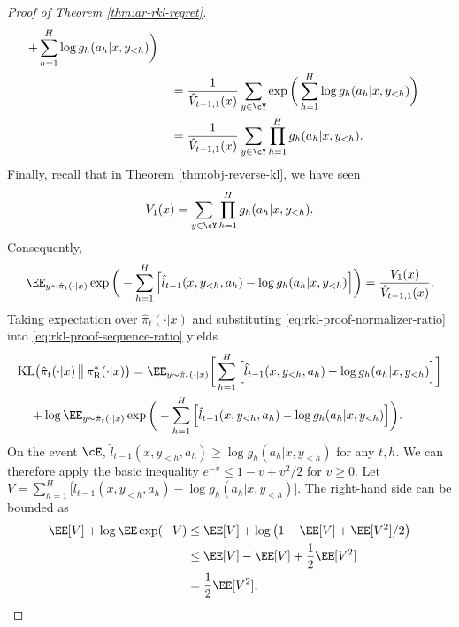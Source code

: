 \documentclass[11pt]{article}
\newcommand{\KL}{\text{KL}}
\newcommand{\pir}{\pi_{\mathrm{R}}}
\begin{document}
\begin{proof}[Proof of Theorem \ref{thm:ar-rkl-regret}]
\begin{align*}
        +
        \sum_{h=1}^H\log g_h(a_h|x,y_{<h})
    \bigg)\\
    &\quad=
    \frac{1}{\hat V_{t-1,1}(x)}
    \sum_{y\in\cY}
    \exp\bigg(
        \sum_{h=1}^H\log g_h(a_h|x,y_{<h})
    \bigg)\\
    &\quad=
    \frac{1}{\hat V_{t-1,1}(x)}
    \sum_{y\in\cY}
    \prod_{h=1}^H g_h(a_h|x,y_{<h}).
\end{align*}
Finally, recall that in Theorem \ref{thm:obj-reverse-kl}, we have seen
\begin{align*}
    V_1(x)
    =
    \sum_{y\in\cY}
    \prod_{h=1}^H g_h(a_h|x,y_{<h}).
\end{align*}
Consequently,
\begin{align}
    \EE_{y\sim\hat\pi_t(\cdot|x)}
    \exp\bigg(
        -\sum_{h=1}^H
        \Big[
            \hat l_{t-1}(x,y_{<h},a_h)
            -
            \log g_h(a_h|x,y_{<h})
        \Big]
    \bigg)
    =
    \frac{V_1(x)}{\hat V_{t-1,1}(x)}.
    \label{eq:rkl-proof-normalizer-ratio}
\end{align}
Taking expectation over $\hat \pi_t(\cdot|x)$ and substituting \eqref{eq:rkl-proof-normalizer-ratio} into
\eqref{eq:rkl-proof-sequence-ratio}  yields
\begin{align}
    &\KL\bigl(
        \hat\pi_t(\cdot|x)
        \,\big\|\,
        \pir^*(\cdot|x)
    \bigr)=
    \EE_{y\sim\hat\pi_t(\cdot|x)}
    \bigg[
        \sum_{h=1}^H
        \Big[
            \hat l_{t-1}(x,y_{<h},a_h)
            -
            \log g_h(a_h|x,y_{<h})
        \Big]
    \bigg]\notag\\
    &\quad+
    \log\EE_{y\sim\hat\pi_t(\cdot|x)}
    \exp\bigg(
        -\sum_{h=1}^H
        \Big[
            \hat l_{t-1}(x,y_{<h},a_h)
            -
            \log g_h(a_h|x,y_{<h})
        \Big]
    \bigg).
    \label{eq:rkl-proof-kl-identity}
\end{align}
On the event $\cE$, $\hat l_{t-1}(x,y_{<h},a_h) \ge \log g_h(a_h|x,y_{<h})$ for any $t,h$. We can therefore apply the basic inequality $e^{-v}\leq1-v+v^2/2$ for $v\geq0$. Let $V = \sum_{h=1}^H
        \big[
            \hat l_{t-1}(x,y_{<h},a_h)
            -
            \log g_h(a_h|x,y_{<h})
        \big]$. The right-hand side can be bounded as
        \begin{align*}
            \EE[V] + \log \EE \exp(-V) &\le \EE[V] + \log \big(1-\EE [V]+\EE [V^2]/2\big)\\
            & \le \EE[V] - \EE[V] + \frac{1}{2} \EE [V^2]\\
            &= \frac{1}{2} \EE [V^2],

\end{align*}
\end{proof}
\end{document}
